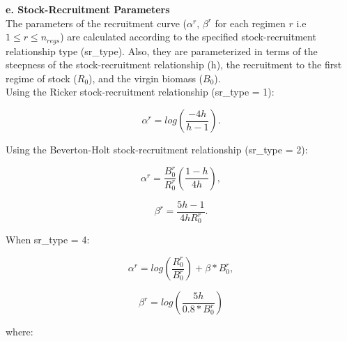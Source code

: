 \documentclass{article}
\begin{document}
\hfill

\textbf{e. Stock-Recruitment Parameters}\\

The parameters of the recruitment curve ($\alpha^r$, $\beta^r$ for each regimen $r$ i.e $1\leq r \leq n_{regs}$) are calculated according to the specified stock-recruitment relationship type (sr\_type). Also, they are parameterized in terms of the steepness of the stock-recruitment relationship (h), the recruitment to the first regime of stock ($R_0$), and the virgin biomass ($B_0$).\\

Using the Ricker stock-recruitment relationship (sr\_type = 1):

\begin{equation}
\alpha^r = log\left(\dfrac{-4h}{h-1}\right).
\end{equation}

Using the Beverton-Holt stock-recruitment relationship (sr\_type = 2):

\begin{equation}
\alpha^r = \dfrac{B^{r}_0}{R^{r}_0}\left(\dfrac{1 - h}{4h}\right),  
\end{equation}

\begin{equation}
\beta^r = \dfrac{5h-1}{4hR^{r}_0}.
\end{equation}

When sr\_type = 4:

\begin{equation}
\alpha^r = log\left(\dfrac{R^{r}_0}{B^{r}_0}\right)+\beta*B^{r}_0, 
\end{equation}

\begin{equation}
\beta^r = log\left(\dfrac{5h}{0.8*B^{r}_0}\right)
\end{equation}

where:
\end{document}
